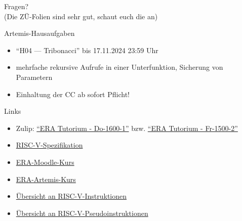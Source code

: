 \begin{frame}[c, fragile]{}{}
	\begin{center}
		\LARGE Fragen?\\
		\Large (Die ZÜ-Folien sind sehr gut, schaut euch die an)
	\end{center}
\end{frame}

\begin{frame}[c, fragile]{Artemis-Hausaufgaben}{}
	\begin{itemize}
		\item \enquote{H04 --- Tribonacci} bis 17.11.2024 23:59 Uhr
		\item mehrfache rekursive Aufrufe in einer Unterfunktion, Sicherung von Parametern
		\item Einhaltung der CC ab sofort Pflicht!
	\end{itemize}
\end{frame}

\begin{frame}[c, fragile]{Links}{}
	\begin{itemize}
		\item Zulip: \href{https://zulip.in.tum.de/#narrow/stream/2661-ERA-Tutorium---Do-1600-1}{\enquote{ERA Tutorium - Do-1600-1}}
		      bzw. \href{https://zulip.in.tum.de/#narrow/stream/2675-ERA-Tutorium---Fr-1500-2 }{\enquote{ERA Tutorium - Fr-1500-2}}
		\item \href{https://riscv.org/wp-content/uploads/2017/05/riscv-spec-v2.2.pdf}{RISC-V-Spezifikation}
		\item \href{https://www.moodle.tum.de/course/view.php?id=100633}{ERA-Moodle-Kurs}
		\item \href{https://artemis.in.tum.de/courses/401}{ERA-Artemis-Kurs}
		\item \href{https://msyksphinz-self.github.io/riscv-isadoc/html/rvi.html}{Übersicht an RISC-V-Instruktionen}
		\item \href{https://github.com/riscv-non-isa/riscv-asm-manual/blob/main/src/asm-manual.adoc#a-listing-of-standard-risc-v-pseudoinstructions}{Übersicht an RISC-V-Pseudoinstruktionen}
	\end{itemize}
\end{frame}

\maketitle


